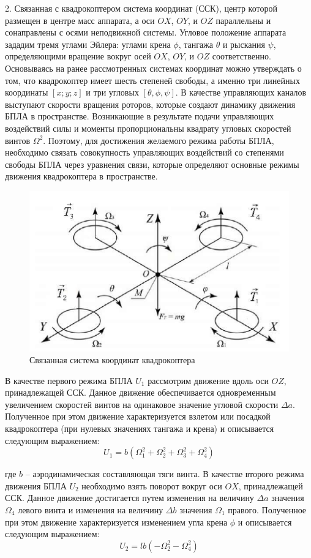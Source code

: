 2. Связанная с квадрокоптером система координат (ССК), центр которой размещен в центре масс аппарата, а оси \(OX\), \(OY\), и \(OZ\) параллельны и сонаправлены с осями неподвижной системы. Угловое положение аппарата зададим тремя углами Эйлера: углами крена \(\phi\), тангажа \(\theta\) и рыскания \(\psi\), определяющими вращение вокруг осей \(OX\), \(OY\), и \(OZ\) соответственно. Основываясь на ранее рассмотренных системах координат можно утверждать о том, что квадрокоптер имеет шесть степеней свободы, а именно три линейных координаты \([x; y; z ]\) и три угловых \([\theta, \phi, \psi]\). В качестве управляющих каналов выступают скорости вращения роторов, которые создают динамику движения БПЛА в пространстве. Возникающие в результате подачи управляющих воздействий силы и моменты пропорциональны квадрату угловых скоростей винтов \(\Omega^2\). Поэтому, для достижения желаемого режима работы БПЛА, необходимо связать совокупность управляющих воздействий со степенями свободы БПЛА через уравнения связи, которые определяют основные режимы движения квадрокоптера в пространстве.
\begin{figure}[H]
	\centering
	\includegraphics[width=0.5\linewidth]{../RW/pics/ris1}
	\caption{Связанная система координат квадрокоптера \cite{mathmodel}
	}
	\label{fig:ris1}
\end{figure}

\newpage 
В качестве первого режима БПЛА \(U_{1}\) рассмотрим движение вдоль оси \(OZ\), принадлежащей ССК. Данное движение обеспечивается одновременным увеличением скоростей винтов на одинаковое значение угловой скорости \(\Delta a\). Полученное при этом движение характеризуется взлетом или посадкой квадрокоптера (при нулевых значениях тангажа и крена) и описывается следующим выражением:
\begin{equation}
U_{1}=b(\Omega_{1}^2+\Omega_{2}^2+\Omega_{3}^2+\Omega_{4}^2)
\end{equation}

где \(b\) -- аэродинамическая составляющая тяги винта.
В качестве второго режима движения БПЛА \(U_{2}\) необходимо взять поворот вокруг оси \(OX\), принадлежащей ССК. Данное движение достигается путем изменения на величину \(\Delta a\) значения \(\Omega_{4}\) левого винта и изменения на величину \(\Delta b\) значения \(\Omega_{1}\)
правого. Полученное при этом движение характеризуется изменением угла крена \(\phi\) и описывается следующим выражением:
\begin{equation}
U_{2}=lb(-\Omega_{2}^2-\Omega_{4}^2)
\end{equation}

